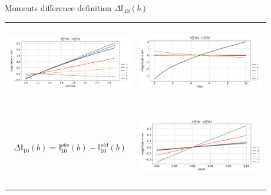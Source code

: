 \documentclass{beamer}
\begin{document}
\begin{frame}{Moments difference definition $\Delta \mathbb{I}_{10}(b)$}
\begin{tabular}{cc}
\includegraphics[width=5.5cm,height=3.5cm,angle=0]{figs/PCCorr/fig1_II10diff_airmass.png}
&
\includegraphics[width=5.5cm,height=3.5cm,angle=0]{figs/PCCorr/fig2_II10diff_PWV.png} \\

 $\boxed{\Delta \mathbb{I}_{10}(b)  =   \mathbb{I}_{10}^{obs}(b)  -  \mathbb{I}_{10}^{std}(b)}$ & \includegraphics[width=5.5cm,height=3.5cm,angle=0]{figs/PCCorr/fig3_II10diff_aer.png}
\end{tabular}
\end{frame}
\end{document}
